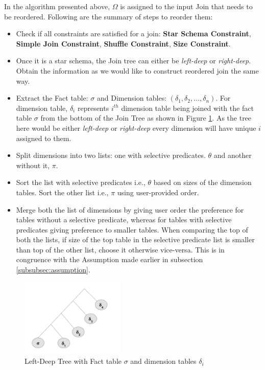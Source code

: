 In the algorithm presented above, $\Omega$ is assigned to the input Join that needs to be reordered. Following are the summary of steps to reorder them:
\begin{itemize}
\item Check if all constraints are satisfied for a join: \textbf{Star Schema Constraint}, \textbf{Simple Join Constraint}, \textbf{Shuffle Constraint}, \textbf{Size Constraint}.
\item Once it is a star schema, the Join tree can either be \textit{left-deep} or \textit{right-deep}. Obtain the information as we would like to construct reordered join the same way.
\item Extract the Fact table: $\sigma$ and Dimension tables: $ (\delta_1, \delta_2, \ldots, \delta_n)$. For dimension table, $\delta_i$ represents  $i^{th}$ dimension table being joined with the fact table $\sigma$ from the bottom of the Join Tree as shown in Figure \ref{left-deep}. As the tree here would be either \textit{left-deep} or \textit{right-deep} every dimension will have unique $i$ assigned to them.
\item Split dimensions into two lists: one with selective predicates. $\theta$ and another without it, $\pi$.
\item Sort the list with selective predicates i.e., $\theta$ based on sizes of the dimension tables. Sort the other list i.e., $\pi$ using user-provided order.
\item Merge both the list of dimensions by giving user order the preference for tables without a selective predicate, whereas for tables with selective predicates giving preference to smaller tables. When comparing the top of both the lists, if size of the top table in the selective predicate list is smaller than top of the other list, choose it otherwise vice-versa. This is in congruence with the Assumption made earlier in subsection \ref{subsubsec:assumption}.
\end{itemize}

\begin{figure}[ht]
\centerline{\includegraphics[width=5cm]{fig/left-deep.png}}
\caption{Left-Deep Tree with Fact table $\sigma$ and dimension tables $\delta_i$}
\label{left-deep}
\end{figure}

